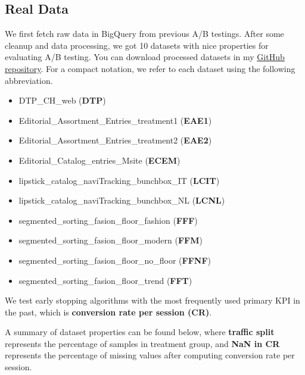 \documentclass[paper=a4, fontsize=11pt]{scrartcl} %
\numberwithin{equation}{section} %
\numberwithin{figure}{section} %
\numberwithin{table}{section} %
\begin{document}
\subsection{Real Data}
We first fetch raw data in BigQuery from previous A/B testings. After some cleanup and data processing, we got 10 datasets with nice properties for evaluating A/B testing. You can download processed datasets in my \href{https://github.com/shansfolder/ABTestingEarlyStoppingEvaluation/tree/master/data/real/processed}{\underline{GitHub repository}}. For a compact notation, we refer to each dataset using the following abbreviation.
\begin{itemize}[noitemsep]
\item DTP\_CH\_web (\textbf{DTP})
\item Editorial\_Assortment\_Entries\_treatment1 (\textbf{EAE1})
\item Editorial\_Assortment\_Entries\_treatment2 (\textbf{EAE2})
\item Editorial\_Catalog\_entries\_Msite (\textbf{ECEM})
\item lipstick\_catalog\_naviTracking\_bunchbox\_IT (\textbf{LCIT})
\item lipstick\_catalog\_naviTracking\_bunchbox\_NL (\textbf{LCNL})
\item segmented\_sorting\_fasion\_floor\_fashion (\textbf{FFF})
\item segmented\_sorting\_fasion\_floor\_modern (\textbf{FFM})
\item segmented\_sorting\_fasion\_floor\_no\_floor (\textbf{FFNF})
\item segmented\_sorting\_fasion\_floor\_trend (\textbf{FFT})
\end{itemize}

We test early stopping algorithms with the most frequently used primary KPI in the past, which is \textbf{conversion rate per session (CR)}.

A summary of dataset properties can be found below, where \textbf{traffic split} represents the percentage of samples in treatment group, and \textbf{NaN in CR} represents the percentage of missing values after computing conversion rate per session.
\end{document}
